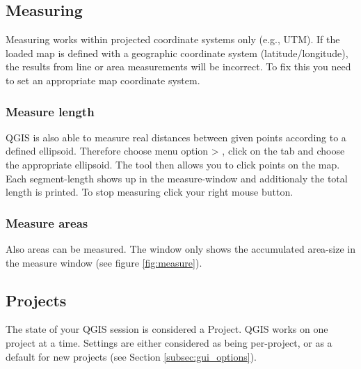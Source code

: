 \subsection{Measuring}\label{sec:measure}

Measuring works within projected coordinate systems only (e.g., UTM). If 
the loaded map is defined with a geographic coordinate system
(latitude/longitude), the results from line or area measurements will be 
incorrect. To fix this you need to set an appropriate map coordinate system.

\subsubsection{Measure length}
QGIS is also able to measure real distances between given 
points according to a defined ellipsoid. Therefore choose menu option  > , 
click on the  tab and choose the appropriate ellipsoid. The tool then allows you to 
click points on the map. Each segment-length shows up in the measure-window and additionaly the total 
length is printed. To stop measuring click your right mouse button. 

\subsubsection{Measure areas}
Also areas can be measured. The window only shows the
accumulated area-size in the measure window (see figure \ref{fig:measure}).


\subsection{Projects}\label{sec:projects}

The state of your QGIS session is considered a Project.  QGIS
works on one project at a time.  Settings are either considered
as being per-project, or as a default for new projects (see
Section \ref{subsec:gui_options}).

